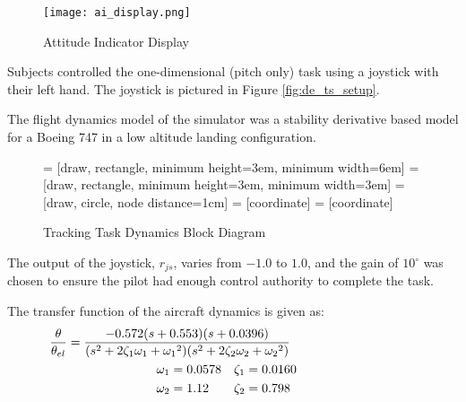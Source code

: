 \begin{figure}
    \texttt{[image: ai\_display.png]}
    \caption{Attitude Indicator Display}
    \label{fig:de_ai_display}
\end{figure}

Subjects controlled the one-dimensional (pitch only) task using a joystick with their left hand.
The joystick is pictured in Figure \ref{fig:de_ts_setup}.

The flight dynamics model of the simulator was a stability derivative based model for a Boeing 747 in a low altitude landing configuration.

\begin{figure}
     = [draw, rectangle, minimum height=3em, minimum width=6em]
     = [draw, rectangle, minimum height=3em, minimum width=3em]
     = [draw, circle, node distance=1cm]
     = [coordinate]
     = [coordinate]
    \caption{Tracking Task Dynamics Block Diagram}
    \label{fig:de_block_diagram}
\end{figure}

The output of the joystick, $r_{js}$, varies from $-1.0$ to $1.0$, and the gain of $10^{\circ}$ was chosen to ensure the pilot had enough control authority to complete the task.

The transfer function of the aircraft dynamics is given as:
\begin{align}
    \mathclap{ %
        \frac{\theta}{\theta_{el}}
        =
        \frac{
            -0.572 (s+0.553) (s+0.0396)
        }{
            (s^2 + 2\zeta_1 \omega_1 + {\omega_1}^2)
            (s^2 + 2\zeta_2 \omega_2 + {\omega_2}^2)
        }
    }\\
    \omega_1 &= 0.0578 & \zeta_1 &= 0.0160 \nonumber \\
    \omega_2 &= 1.12 & \zeta_2 &= 0.798 \nonumber
\end{align}


